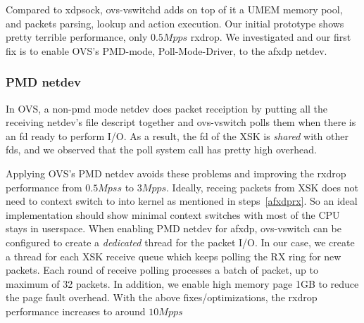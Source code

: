 \documentclass[10pt]{sigplanconf}
\begin{document}
Compared to xdpsock, ovs-vswitchd adds on top of it a UMEM memory pool,
and packets parsing, lookup and action execution.
Our initial prototype shows pretty terrible performance, only $0.5Mpps$ rxdrop.
We investigated and our first fix is to enable OVS's PMD-mode,
Poll-Mode-Driver, to the afxdp netdev.

\subsubsection{PMD netdev}
In OVS, a non-pmd mode netdev does packet receiption by putting all the receiving
netdev's file descript together and ovs-vswitch polls them when there is an fd ready
to perform I/O.  As a result, the fd of the XSK is {\em shared} with other fds, and
we observed that the poll system call has pretty high overhead.

Applying OVS's PMD netdev avoids these problems and improving the rxdrop performance
from $0.5Mpss$ to $3Mpps$.  Ideally, receing packets from XSK does not need to context
switch to into kernel as mentioned in steps~\ref{afxdprx}. So an ideal implementation
should show minimal context switches with most of the CPU stays in userspace. 
When enabling PMD netdev for afxdp, ovs-vswitch can be
configured to create a {\em dedicated} thread for the packet I/O.  
In our case, we create a thread for each XSK receive queue which keeps polling
the RX ring for new packets.  Each round of receive polling processes a batch of
packet, up to maximum of 32 packets. In addition, we enable high memory page 1GB to
reduce the page fault overhead.  With the above fixes/optimizations, the rxdrop
performance increases to around $10Mpps$
\end{document}
